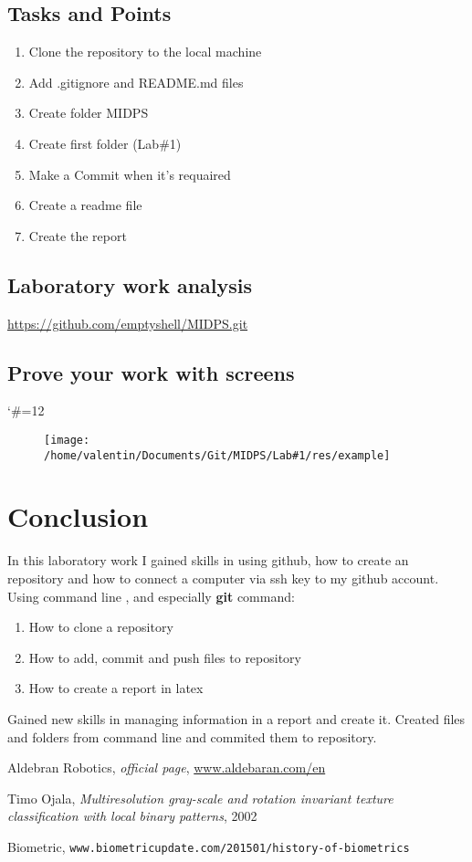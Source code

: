 \documentclass[12pt,a4paper,titlepage]{article}
\begin{document}
	\subsection{Tasks and Points}
			\begin{enumerate}
				\item Clone the repository to the local machine
				\item Add .gitignore and README.md files
				\item Create folder MIDPS
				\item Create first folder (Lab\#1)
				\item Make a Commit when it's requaired
				\item Create a readme file
				\item Create the report
			\end{enumerate}
	\subsection{Laboratory work analysis}
	\newcommand\tab[1][1cm]{\hspace*{#1}}
			\tab \url{https://github.com/emptyshell/MIDPS.git}
	\subsection{Prove your work with screens}
	\begingroup
	\catcode`\#=12
	\begin{figure}[hb!]
	\centering
	\texttt{[image: /home/valentin/Documents/Git/MIDPS/Lab\#1/res/example]}
	\end{figure}	
	\endgroup 
	\pagebreak
	\newpage
	\section*{Conclusion}
	In this laboratory work I gained skills in using github, how to create an repository and how to connect a computer via ssh key to my github account. Using command line , and especially \textbf{git} command: 
	\begin{enumerate}
		\item How to clone a repository
		\item How to add, commit and push files to repository
		\item How to create a report in latex
	\end{enumerate}
	Gained new skills in managing information in a report and create it. Created files and folders from command line and commited them to repository.
	\clearpage
	\pagebreak
	\newpage
	\begin{thebibliography}{99999}
	\singlespace
	\normalsize
	 Aldebran Robotics, \textit{ official page}, \url{www.aldebaran.com/en}


	 Timo Ojala, \textit{Multiresolution gray-scale and rotation invariant texture classification with local binary patterns}, 2002

	 Biometric, \texttt{www.biometricupdate.com/201501/history-of-biometrics}
	\end{thebibliography} 		
\end{document}
